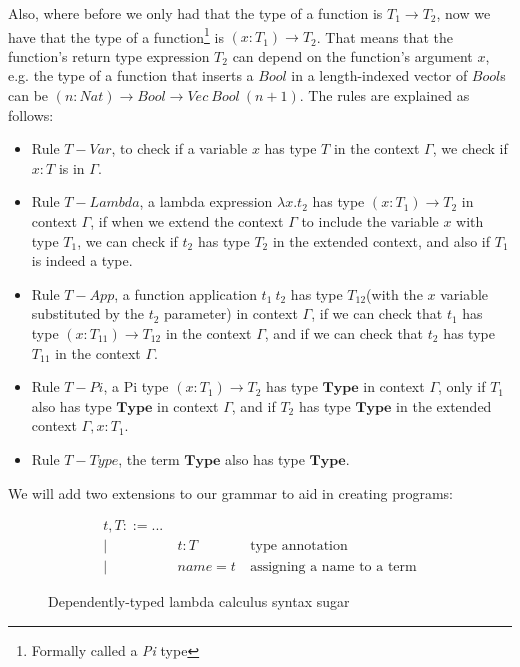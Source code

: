 \documentclass[12pt]{article}
\theoremstyle{definition}
\newcommand{\fnarrow}{\rightarrow}
\newcommand{\tylit}{\textbf{Type}}
\begin{document}
Also, where before we only had that the type of a function is $T_1 \fnarrow T_2$, now we have that the type of a function\footnote{Formally called a \emph{Pi} type} is $(x:T_1) \fnarrow T_2$. That means that the function's return type expression $T_2$ can depend on the function's argument $x$, e.g. the type of a function that inserts a $Bool$ in a length-indexed vector of $Bool$s can be $(n:Nat) \fnarrow Bool \fnarrow Vec\ Bool\ (n+1)$.
The rules are explained as follows:
\begin{itemize}
       \item Rule $T-Var$, to check if a variable $x$ has type $T$ in the context $\Gamma$, we check if $x:T$ is in $\Gamma$.
       \item Rule $T-Lambda$, a lambda expression $\lambda x.t_2$ has type $(x:T_1) \fnarrow T_2$ in context $\Gamma$, if when we extend the context $\Gamma$ to include the variable $x$ with type $T_1$, we can check if $t_2$ has type $T_2$ in the extended context, and also if $T_1$ is indeed a type.
       \item Rule $T-App$, a function application $t_1\ t_2$ has type $T_{12}$(with the $x$ variable substituted by the $t_2$ parameter) in context $\Gamma$, if we can check that $t_1$ has type $(x:T_{11}) \fnarrow T_{12}$ in the context $\Gamma$, and if we can check that $t_2$ has type $T_{11}$ in the context $\Gamma$.
       \item Rule $T-Pi$, a Pi type $(x:T_1)\fnarrow T_2$ has type $\tylit$ in context $\Gamma$, only if $T_1$ also has type $\tylit$ in context $\Gamma$, and if $T_2$ has type $\tylit$ in the extended context $\Gamma, x:T_1$.
       \item Rule $T-Type$, the term $\tylit$ also has type $\tylit$.
\end{itemize}

We will add two extensions to our grammar to aid in creating programs:

\begin{figure}[H]
       \[
              \begin{aligned}
                     t, T ::= ...                                         \\
                     | & \ t : T    & \ \text{type annotation}            \\
                     | & \ name = t & \ \text{assigning a name to a term}
              \end{aligned}
       \]
       \caption{Dependently-typed lambda calculus syntax sugar}
\end{figure}
\end{document}
